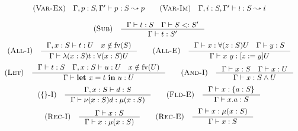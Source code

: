 \[\begin{array}{c}
    \RULE{Var-Ex} \quad \TJ{\Gamma, p: S, \Gamma'}{p}{S}{p} \qquad

    \RULE{Var-Im} \quad \TJ{\Gamma, i: S, \Gamma'}{\IMP}{S}{i} \\[4mm]

    \RULE{Sub} \quad \inference{
        \TJT{\Gamma}{t}{S} \quad
        \SJT{\Gamma}{S}{S'}
    }{
        \TJT{\Gamma}{t}{S'}
    } \\[4mm]

    \RULE{All-I} \quad \inference{
        \TJT{\Gamma, x: S}{t}{U} \quad
        x \notin \FV{S}
    }{
        \TJT{\Gamma}{\ABS{x}{S}{t}}{\DFUN{x}{S}{U}}
    } \qquad

    \RULE{All-E} \quad \inference{
        \TJT{\Gamma}{x}{\DFUN{z}{S}{U}} \quad
        \TJT{\Gamma}{y}{S}
    }{
        \TJT{\Gamma}{x\ y}{\SUB{z}{y}U}
    } \\[4mm]

    \RULE{Let} \quad \inference{
        \TJT{\Gamma}{t}{S} \quad
        \TJT{\Gamma, x: S}{u}{U} \quad
        x \notin \FV{U}
    }{
        \TJT{\Gamma}{\LET{x}{t}{u}}{U}
    } \qquad

    \RULE{And-I} \quad \inference{
        \TJT{\Gamma}{x}{S} \quad
        \TJT{\Gamma}{x}{U}
    }{
        \TJT{\Gamma}{x}{\AGG{S}{U}}
    } \\[4mm]

    \RULE{\{\}-I} \quad \inference{
        \TJT{\Gamma, x: S}{d}{S}
    }{
        \TJT{\Gamma}{\OBJ{x}{S}{d}}{\REC{x}{S}}
    } \qquad

    \RULE{Fld-E} \quad \inference{
        \TJT{\Gamma}{x}{\FDEC{a}{S}}
    }{
        \TJT{\Gamma}{x.a}{S}
    } \\[4mm]

    \RULE{Rec-I} \quad \inference{
        \TJT{\Gamma}{x}{S}
    }{
        \TJT{\Gamma}{x}{\REC{x}{S}}
    } \qquad

    \RULE{Rec-E} \quad \inference{
        \TJT{\Gamma}{x}{\REC{x}{S}}
    }{
        \TJT{\Gamma}{x}{S}
    }
\end{array}\]
